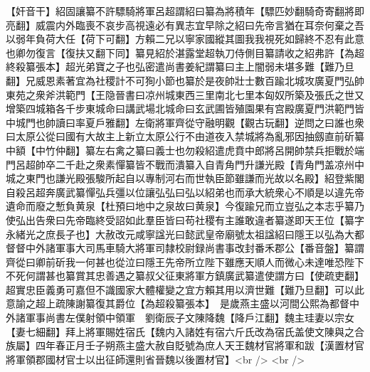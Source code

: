 【奸音干】紹固讓纂不許驃騎將軍呂超謂紹曰纂為將積年【驃匹妙翻騎奇寄翻將即亮翻】威震内外臨喪不哀步高視遠必有異志宜早除之紹曰先帝言猶在耳奈何棄之吾以弱年負荷大任【荷下可翻】方賴二兄以寧家國縱其圖我我視死如歸終不忍有此意也卿勿復言【復扶又翻下同】纂見紹於湛露堂超執刀侍側目纂請收之紹弗許【為超終殺纂張本】超光弟寶之子也弘密遣尚書姜紀謂纂曰主上闇弱未堪多難【難乃旦翻】兄威恩素著宜為社稷計不可狥小節也纂於是夜帥壯士數百踰北城攻廣夏門弘帥東苑之衆斧洪範門【王隐晉書曰凉州城東西三里南北七里本匈奴所築及張氏之世又增築四城箱各千步東城命曰講武場北城命曰玄武圃皆殖園果有宫殿廣夏門洪範門皆中城門也帥讀曰率夏戶雅翻】左衛將軍齊從守融明觀【觀古玩翻】逆問之曰誰也衆曰太原公從曰國有大故主上新立太原公行不由道夜入禁城將為亂邪因抽劔直前斫纂中額【中竹仲翻】纂左右禽之纂曰義士也勿殺紹遣虎賁中郎將呂開帥禁兵拒戰於端門呂超帥卒二千赴之衆素憚纂皆不戰而潰纂入自青角門升謙光殿【青角門盖凉州中城之東門也謙光殿張駿所起自以專制河右而世執臣節雖謙而光故以名殿】紹登紫閣自殺呂超奔廣武纂憚弘兵彊以位讓弘弘曰弘以紹弟也而承大統衆心不順是以違先帝遺命而廢之慙負黄泉【杜預曰地中之泉故曰黄泉】今復踰兄而立豈弘之本志乎纂乃使弘出告衆曰先帝臨終受詔如此羣臣皆曰苟社稷有主誰敢違者纂遂即天王位【纂字永緒光之庶長子也】大赦改元咸寧諡光曰懿武皇帝廟號太祖諡紹曰隱王以弘為大都督督中外諸軍事大司馬車騎大將軍司隸校尉録尚書事改封番禾郡公【番音盤】纂謂齊從曰卿前斫我一何甚也從泣曰隱王先帝所立陛下雖應天順人而微心未達唯恐陛下不死何謂甚也纂賞其忠善遇之纂叔父征東將軍方鎮廣武纂遣使謂方曰【使疏吏翻】超實忠臣義勇可嘉但不識國家大體權變之宜方賴其用以濟世難【難乃旦翻】可以此意諭之超上疏陳謝纂復其爵位【為超殺纂張本】　是歲燕主盛以河間公熙為都督中外諸軍事尚書左僕射領中領軍　劉衛辰子文陳降魏【降戶江翻】魏主珪妻以宗女【妻七細翻】拜上將軍賜姓宿氏【魏内入諸姓有宿六斤氏改為宿氏盖使文陳與之合族屬】四年春正月壬子朔燕主盛大赦自貶號為庶人天王魏材官將軍和跋【漢置材官將軍領郡國材官士以出征師還則省晉魏以後置材官】<br />
<br />
